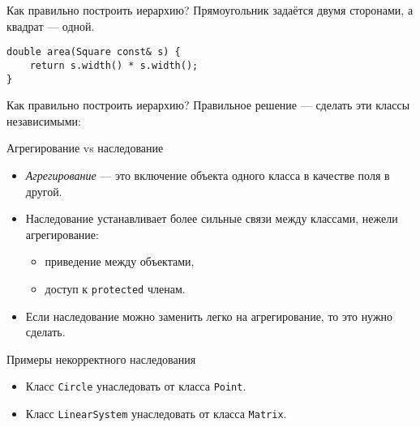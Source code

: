 \documentclass{beamer}
\begin{document}
\begin{frame}[fragile]{Как правильно построить иерархию?}
    Прямоугольник задаётся двумя сторонами, а квадрат — одной.
\begin{center}
\end{center}

\begin{lstlisting}
double area(Square const& s) {
    return s.width() * s.width();
}
\end{lstlisting}
\end{frame}

\begin{frame}[fragile]{Как правильно построить иерархию?}
    Правильное решение — сделать эти классы независимыми:
\begin{center}
\end{center}
\end{frame}

\begin{frame}[fragile]{Агрегирование vs наследование}
    \begin{itemize}
        \item {\em Агрегирование} — это включение объекта одного 
            класса в качестве поля в другой.

        \item Наследование устанавливает более сильные связи
            между классами, нежели агрегирование:
            \begin{itemize}
                \item приведение между объектами,
                \item доступ к {\tt protected} членам.
            \end{itemize}

        \item Если наследование можно заменить легко на агрегирование,
            то это нужно сделать.
    \end{itemize}
\begin{block}{Примеры некорректного наследования}
\begin{itemize}
    \item Класс {\tt Circle} унаследовать от класса {\tt Point}.
    \item Класс {\tt LinearSystem} унаследовать от класса {\tt Matrix}.
\end{itemize}
\end{block}
\end{frame}
\end{document}
